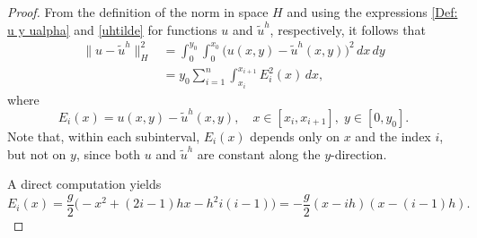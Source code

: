 \documentclass[axioms,article,submit,moreauthors]{Definitions/mdpi}
\newcommand{\dee}{d}
\begin{document}
\begin{proof} 
From the definition of the norm in space $H$ and using the expressions \eqref{Def: u y ualpha} and \eqref{uhtilde} for functions $u$ and ${\widetilde{u}^h}$, respectively, it follows that
\begin{equation}\label{cuenta-intermedia}
\begin{aligned}
\|u-{\widetilde{u}^h}\|_{H}^2
&= \int_0^{y_0} \int_0^{x_0} \big(u(x,y)-{\widetilde{u}^h}(x,y)\big)^2 \, \dee x \, \dee y \\[1ex]
&= y_0 \sum_{i=1}^n \int_{x_i}^{x_{i+1}} E_i^2(x)\, \dee x,
\end{aligned}
\end{equation}
where 
\[
E_i(x) = u(x,y) - {\widetilde{u}^h}(x,y), \quad x \in [x_i, x_{i+1}], \; y \in [0, y_0].
\] 
Note that, within each subinterval, $E_i(x)$ depends only on $x$ and the index $i$, but not on $y$, since both $u$ and ${\widetilde{u}^h}$ are constant along the $y$-direction.  

A direct computation yields
\begin{equation}\label{Ei}
E_i(x) = \frac{g}{2} \Big(-x^2 + (2i-1) h x - h^2 i(i-1) \Big) 
= -\frac{g}{2} (x - i h)(x - (i-1) h).
\end{equation}


\end{proof}
\end{document}
